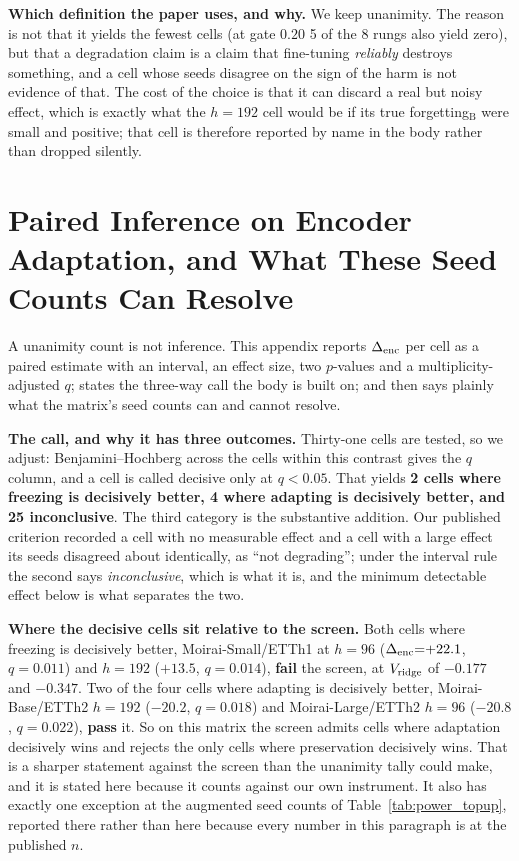 \textbf{Which definition the paper uses, and why.} We keep unanimity. The reason
is not that it yields the fewest cells (at gate $0.20$ 5 of the 8 rungs
also yield zero), but that a degradation claim is a claim that fine-tuning
\emph{reliably} destroys something, and a cell whose seeds disagree on the sign
of the harm is not evidence of that. The cost of the choice is that it can
discard a real but noisy effect, which is exactly what the $h{=}192$ cell would
be if its true forgetting$_\text{B}$ were small and positive; that cell is
therefore reported by name in the body rather than dropped silently.

\clearpage
\section{Paired Inference on Encoder Adaptation, and What These Seed Counts Can
Resolve}
\label{app:pairedinference}

A unanimity count is not inference.  This appendix reports $\Delta_\text{enc}$ per cell as a
paired estimate with an interval, an effect size, two $p$-values and a
multiplicity-adjusted $q$; states the three-way call the body is built on; and
then says plainly what the matrix's seed counts can and cannot resolve.



\textbf{The call, and why it has three outcomes.}  Thirty-one cells are tested,
so we adjust: Benjamini--Hochberg across the cells within this contrast gives the
$q$ column, and a cell is called decisive only at $q{<}0.05$.  That yields
\textbf{2 cells where freezing is decisively better, 4 where adapting is
decisively better, and 25 inconclusive}.  The third category is the substantive
addition.  Our published criterion recorded a cell with no measurable effect and a
cell with a large effect its seeds disagreed about identically, as ``not
degrading''; under the interval rule the second says \emph{inconclusive}, which is
what it is, and the minimum detectable effect below is what separates the two.

\textbf{Where the decisive cells sit relative to the screen.}  Both cells where
freezing is decisively better, Moirai-Small/ETTh1 at $h{=}96$ ($\Delta_\text{enc}{=}{+}22.1$,
$q{=}0.011$) and $h{=}192$ ($+13.5$, $q{=}0.014$), \textbf{fail} the screen, at
$V_{\text{ridge}}$ of $-0.177$ and $-0.347$.  Two of the four cells where adapting
is decisively better, Moirai-Base/ETTh2 $h{=}192$ ($-20.2$, $q{=}0.018$) and
Moirai-Large/ETTh2 $h{=}96$ ($-20.8$, $q{=}0.022$), \textbf{pass} it.  So on this
matrix the screen admits cells where adaptation decisively wins and rejects the
only cells where preservation decisively wins.  That is a sharper statement against
the screen than the unanimity tally could make, and it is stated here because it
counts against our own instrument.  It also has exactly one exception at the augmented
seed counts of Table~\ref{tab:power_topup}, reported there rather than here because
every number in this paragraph is at the published $n$.

